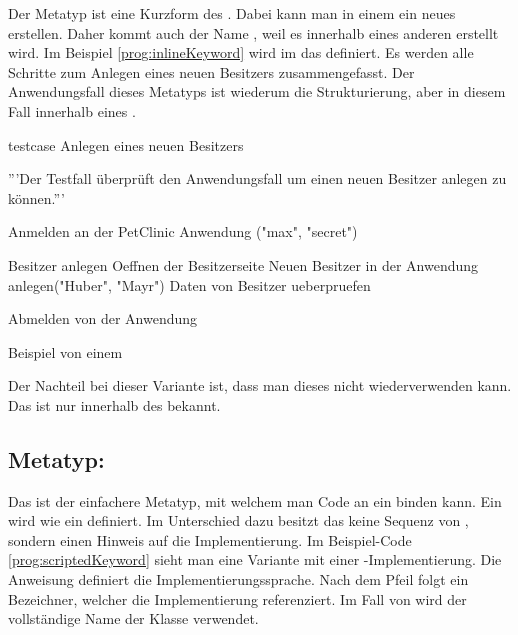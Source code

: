 Der Metatyp  ist eine Kurzform des . Dabei kann man in einem  ein neues  erstellen. Daher kommt auch der Name , weil es innerhalb eines anderen  erstellt wird. Im Beispiel \ref{prog:inlineKeyword} wird im   das   definiert. Es werden alle Schritte zum Anlegen eines neuen Besitzers zusammengefasst. Der Anwendungsfall dieses Metatyps ist wiederum die Strukturierung, aber in diesem Fall innerhalb eines . 

\begin{program}
\begin{JavaCode}
testcase Anlegen eines neuen Besitzers {
	'''Der Testfall überprüft den Anwendungsfall um einen 
	   neuen Besitzer anlegen zu können.'''
	
	Anmelden an der PetClinic Anwendung ("max", "secret")
	
	Besitzer anlegen {
		Oeffnen der Besitzerseite		
		Neuen Besitzer in der Anwendung anlegen("Huber", "Mayr")
		Daten von Besitzer ueberpruefen
	}
	
	Abmelden von der Anwendung
}
\end{JavaCode}
\caption{Beispiel von einem }
\label{prog:inlineKeyword}
\end{program}

\SuperPar
Der Nachteil bei dieser Variante ist, dass man dieses  nicht wiederverwenden kann. Das  ist nur innerhalb des  bekannt.


\subsection{Metatyp: }

Das  ist der einfachere Metatyp, mit welchem man Code an ein  binden kann. Ein  wird wie ein  definiert. Im Unterschied dazu besitzt das  keine Sequenz von , sondern einen Hinweis auf die Implementierung. Im Beispiel-Code \ref{prog:scriptedKeyword} sieht man eine Variante mit einer -Implementierung. Die Anweisung  definiert die Implementierungssprache. Nach dem Pfeil folgt ein Bezeichner, welcher die Implementierung referenziert. Im Fall von  wird der vollständige Name der Klasse verwendet.

